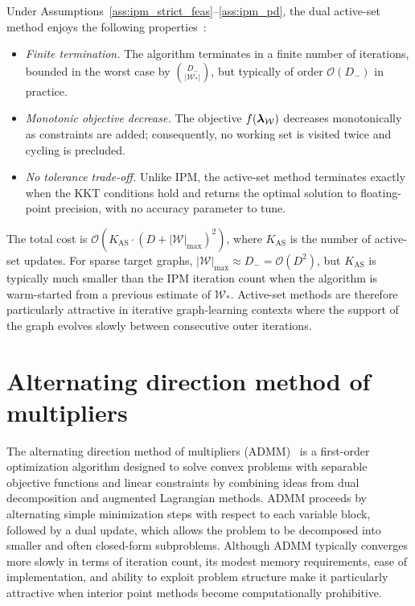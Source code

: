 Under Assumptions~\ref{ass:ipm_strict_feas}--\ref{ass:ipm_pd}, the dual active-set method enjoys the following properties~\cite[\S16.5]{nocedal2006numerical}:
\begin{itemize}
	\item \emph{Finite termination.} The algorithm terminates in a finite number of iterations, bounded in the worst case by $\binom{D_-}{|\mathcal{W}_\ast|}$, but typically of order $\mathcal{O}(D_-)$ in practice.
	\item \emph{Monotonic objective decrease.} The objective $f(\boldsymbol{\lambda}_\mathcal{W})$ decreases monotonically as constraints are added; consequently, no working set is visited twice and cycling is precluded.
	\item \emph{No tolerance trade-off.} Unlike IPM, the active-set method terminates exactly when the KKT conditions hold and returns the optimal solution to floating-point precision, with no accuracy parameter to tune.
\end{itemize}
The total cost is $\mathcal{O}(K_\text{AS}\cdot (D+|\mathcal{W}|_{\max})^2)$, where $K_\text{AS}$ is the number of active-set updates. For sparse target graphs, $|\mathcal{W}|_{\max}\approx D_-=\mathcal{O}(D^2)$, but $K_\text{AS}$ is typically much smaller than the IPM iteration count when the algorithm is warm-started from a previous estimate of $\mathcal{W}_\ast$. Active-set methods are therefore particularly attractive in iterative graph-learning contexts where the support of the graph evolves slowly between consecutive outer iterations.

\section{Alternating direction method of multipliers}

The alternating direction method of multipliers (ADMM)~\cite{admm} is a first-order optimization algorithm designed to solve convex problems with separable objective functions and linear constraints by combining ideas from dual decomposition and augmented Lagrangian methods. ADMM proceeds by alternating simple minimization steps with respect to each variable block, followed by a dual update, which allows the problem to be decomposed into smaller and often closed-form subproblems. Although ADMM typically converges more slowly in terms of iteration count, its modest memory requirements, ease of implementation, and ability to exploit problem structure make it particularly attractive when interior point methods become computationally prohibitive.

